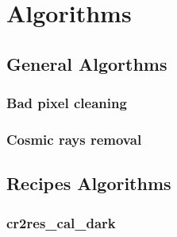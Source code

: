 \section{Algorithms}
\label{sec:ALGORITHMS}


\subsection{General Algorthms}

\subsubsection{Bad pixel cleaning}
\label{sec:ABADPIX}


\subsubsection{Cosmic rays removal}
\label{sec:ACOSMIC}


\subsection{Recipes Algorithms} 

\subsubsection{cr2res\_cal\_dark}
\label{sec:RECIPE_DARK}


\newpage

